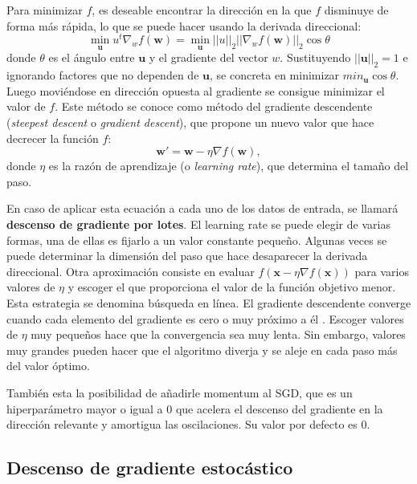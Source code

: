 Para minimizar $f$, es deseable encontrar la dirección en la que $f$ disminuye de forma más rápida, lo que se puede hacer usando la derivada direccional:
\begin{equation}
    \min_{\mathbf{u}} u^t \nabla_w f(\mathbf{w}) = \min_{\mathbf{u}} ||u||_2 ||\nabla_w f(\mathbf{w})||_2 \cos \theta
\end{equation}
donde $\theta$ es el ángulo entre $\mathbf{u}$ y el gradiente del vector $w$. Sustituyendo $||\textbf{u}||_2 = 1$ e ignorando factores que no dependen de $\textbf{u}$, se concreta en minimizar $min_\textbf{u} \cos \theta$. Luego moviéndose en dirección opuesta al gradiente se consigue minimizar el valor de $f$. Este método se conoce como método del gradiente descendente (\textit{steepest descent} o \textit{gradient descent}), que propone un nuevo valor que hace decrecer la función $f$:
\begin{equation}
    \mathbf{w}' = \mathbf{w} - \eta \nabla f(\mathbf{w}),
\end{equation} \label{eq: actuPesos}
donde $\eta$ es la razón de aprendizaje (o \textit{learning rate}), que determina el tamaño del paso. 

En caso de aplicar esta ecuación a cada uno de los datos de entrada, se llamará \textbf{descenso de gradiente por lotes}. El learning rate se puede elegir de varias formas, una de ellas es fijarlo a un valor constante pequeño. Algunas veces se puede determinar la dimensión del paso que hace desaparecer la derivada direccional. Otra aproximación consiste en evaluar $f(\mathbf{x} - \eta \nabla f(\mathbf{x}))$ para varios valores de $\eta$ y escoger el que proporciona el valor de la función objetivo menor. Esta estrategia se denomina búsqueda en línea. El gradiente descendente converge cuando cada elemento del gradiente es cero o muy próximo a él \citep{pajares2021aprendizaje}.  Escoger valores de $\eta$ muy pequeños hace que la convergencia sea muy lenta. Sin embargo, valores muy grandes pueden hacer que el algoritmo diverja y se aleje en cada paso más del valor óptimo.

También esta la posibilidad de añadirle momentum al SGD, que es un hiperparámetro mayor o igual a 0 que acelera el descenso del gradiente en la dirección relevante y amortigua las oscilaciones. Su valor por defecto es 0. 


\subsection{Descenso de gradiente estocástico}

